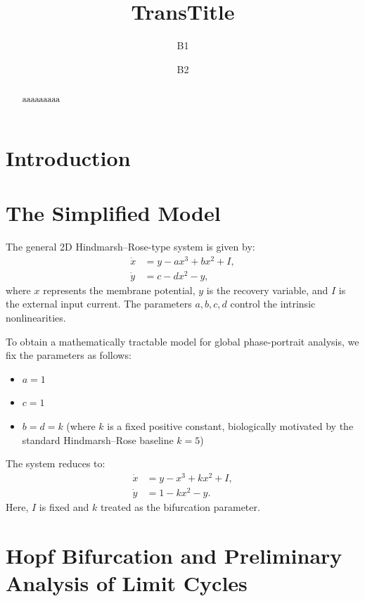 \documentclass[11pt,reqno]{amsart}
\title[T]{TransTitle}
\author[A1]{B1}
\author[A2]{B2}
\theoremstyle{plain}
\theoremstyle{definition}
\theoremstyle{remark}
\begin{document}
\maketitle


\begin{abstract}
aaaaaaaaa
\end{abstract}

\section{Introduction}
\label{sec:intro}

\section{The Simplified Model}

The general 2D Hindmarsh--Rose-type system is given by:
\begin{equation}
\begin{aligned}
\dot{x} &= y - ax^3 + bx^2 + I, \\
\dot{y} &= c - dx^2 - y,
\end{aligned}
\end{equation}
where \(x\) represents the membrane potential, \(y\) is the recovery variable, and \(I\) is the external input current. The parameters \(a, b, c, d\) control the intrinsic nonlinearities.

To obtain a mathematically tractable model for global phase-portrait analysis, we fix the parameters as follows:
\begin{itemize}
    \item \(a = 1\)
    \item \(c = 1\)
    \item \(b = d = k\) (where \(k\) is a fixed positive constant, biologically motivated by the standard Hindmarsh--Rose baseline \(k=5\))
\end{itemize}

The system reduces to:
\begin{equation}
\begin{aligned}
\dot{x} &= y - x^3 + kx^2 + I, \\
\dot{y} &= 1 - kx^2 - y.
\end{aligned} \tag{S}
\label{eq:simplified}
\end{equation}
Here, \(I\) is fixed and $k$ treated as the bifurcation parameter.

\section{Hopf Bifurcation and Preliminary Analysis of Limit Cycles}
\end{document}
